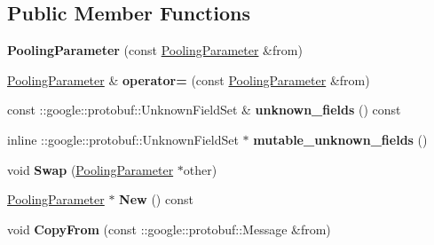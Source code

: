 \subsection*{Public Member Functions}
\begin{DoxyCompactItemize}
\item 
\mbox{\label{classcaffe_1_1_pooling_parameter_a9ad9506cbf66e40ed4ba0a64fed7ac89}} 
{\bfseries Pooling\+Parameter} (const \mbox{\hyperlink{classcaffe_1_1_pooling_parameter}{Pooling\+Parameter}} \&from)
\item 
\mbox{\label{classcaffe_1_1_pooling_parameter_a0d92205f73afe0747a94092b03003ef4}} 
\mbox{\hyperlink{classcaffe_1_1_pooling_parameter}{Pooling\+Parameter}} \& {\bfseries operator=} (const \mbox{\hyperlink{classcaffe_1_1_pooling_parameter}{Pooling\+Parameter}} \&from)
\item 
\mbox{\label{classcaffe_1_1_pooling_parameter_aad96e4c7902476a51161365a5ec54ddf}} 
const \+::google\+::protobuf\+::\+Unknown\+Field\+Set \& {\bfseries unknown\+\_\+fields} () const
\item 
\mbox{\label{classcaffe_1_1_pooling_parameter_ac314d18c39cf12c9a8fefcde0a94d125}} 
inline \+::google\+::protobuf\+::\+Unknown\+Field\+Set $\ast$ {\bfseries mutable\+\_\+unknown\+\_\+fields} ()
\item 
\mbox{\label{classcaffe_1_1_pooling_parameter_a887875fae056125f70fe7aba0ab89d74}} 
void {\bfseries Swap} (\mbox{\hyperlink{classcaffe_1_1_pooling_parameter}{Pooling\+Parameter}} $\ast$other)
\item 
\mbox{\label{classcaffe_1_1_pooling_parameter_a103e7d763ece8039cb5f6f72fafc10a7}} 
\mbox{\hyperlink{classcaffe_1_1_pooling_parameter}{Pooling\+Parameter}} $\ast$ {\bfseries New} () const
\item 
\mbox{\label{classcaffe_1_1_pooling_parameter_ae588669a2c93ce4d8952f28f78ca8a2f}} 
void {\bfseries Copy\+From} (const \+::google\+::protobuf\+::\+Message \&from)
\item 
\mbox{\label{classcaffe_1_1_pooling_parameter_a9ce3fef3800f5474bb8008d60314103b}} 

\end{DoxyCompactItemize}
